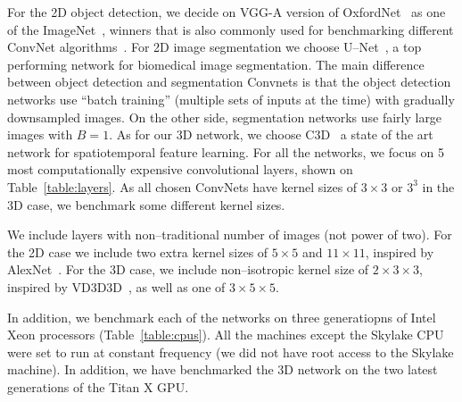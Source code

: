   For the 2D object detection, we decide on VGG-A version of
  OxfordNet~\cite{simonyan2014very} as one of the
  ImageNet~\cite{imagenet_cvpr09,ILSVRC15}, winners that is also
  commonly used for benchmarking different ConvNet
  algorithms~\cite{imagenetwinners}.  For 2D image segmentation we
  choose U--Net~\cite{ronneberger2015u}, a top performing network for
  biomedical image segmentation.  The main difference between object
  detection and segmentation Convnets is that the object detection
  networks use ``batch training'' (multiple sets of inputs at the
  time) with gradually downsampled images.  On the other side,
  segmentation networks use fairly large images with $B=1$.  As for
  our 3D network, we choose C3D~\cite{maturana_iros_2015} a state of
  the art network for spatiotemporal feature learning.  For all the
  networks, we focus on 5 most computationally expensive convolutional
  layers, shown on Table~\ref{table:layers}.  As all chosen ConvNets
  have kernel sizes of $3 \times 3$ or $3^3$ in the 3D case, we
  benchmark some different kernel sizes.

  We include layers with non--traditional number of images (not power
  of two).  For the 2D case we include two extra kernel sizes of $5
  \times 5$ and $11 \times 11$, inspired by
  AlexNet~\cite{krizhevsky2012imagenet}.  For the 3D case, we include
  non--isotropic kernel size of $2 \times 3 \times 3$, inspired by
  VD3D3D~\cite{lee2015recursive}, as well as one of $3 \times 5 \times
  5$.

  In addition, we benchmark each of the networks on three generatiopns
  of Intel Xeon processors (Table~\ref{table:cpus}).  All the machines
  except the Skylake CPU were set to run at constant frequency (we did
  not have root access to the Skylake machine).  In addition, we have
  benchmarked the 3D network on the two latest generations of the
  Titan X GPU.

